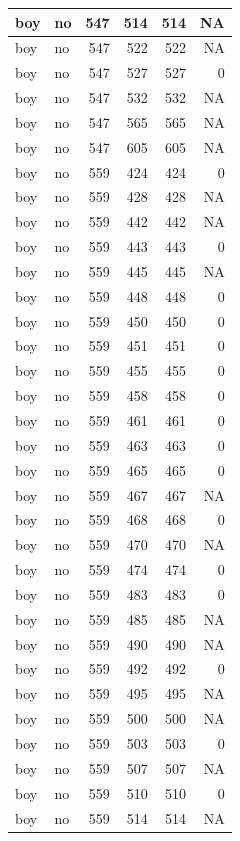 \documentclass[man]{apa6}
\begin{document}
\begin{tabular}{l|l|r|r|r|r}
\hline
boy & no & 547 & 514 & 514 & NA\\
\hline
boy & no & 547 & 522 & 522 & NA\\
\hline
boy & no & 547 & 527 & 527 & 0\\
\hline
boy & no & 547 & 532 & 532 & NA\\
\hline
boy & no & 547 & 565 & 565 & NA\\
\hline
boy & no & 547 & 605 & 605 & NA\\
\hline
boy & no & 559 & 424 & 424 & 0\\
\hline
boy & no & 559 & 428 & 428 & NA\\
\hline
boy & no & 559 & 442 & 442 & NA\\
\hline
boy & no & 559 & 443 & 443 & 0\\
\hline
boy & no & 559 & 445 & 445 & NA\\
\hline
boy & no & 559 & 448 & 448 & 0\\
\hline
boy & no & 559 & 450 & 450 & 0\\
\hline
boy & no & 559 & 451 & 451 & 0\\
\hline
boy & no & 559 & 455 & 455 & 0\\
\hline
boy & no & 559 & 458 & 458 & 0\\
\hline
boy & no & 559 & 461 & 461 & 0\\
\hline
boy & no & 559 & 463 & 463 & 0\\
\hline
boy & no & 559 & 465 & 465 & 0\\
\hline
boy & no & 559 & 467 & 467 & NA\\
\hline
boy & no & 559 & 468 & 468 & 0\\
\hline
boy & no & 559 & 470 & 470 & NA\\
\hline
boy & no & 559 & 474 & 474 & 0\\
\hline
boy & no & 559 & 483 & 483 & 0\\
\hline
boy & no & 559 & 485 & 485 & NA\\
\hline
boy & no & 559 & 490 & 490 & NA\\
\hline
boy & no & 559 & 492 & 492 & 0\\
\hline
boy & no & 559 & 495 & 495 & NA\\
\hline
boy & no & 559 & 500 & 500 & NA\\
\hline
boy & no & 559 & 503 & 503 & 0\\
\hline
boy & no & 559 & 507 & 507 & NA\\
\hline
boy & no & 559 & 510 & 510 & 0\\
\hline
boy & no & 559 & 514 & 514 & NA\\

\end{tabular}
\end{document}
